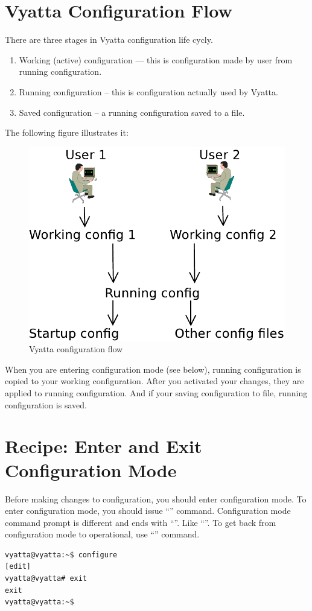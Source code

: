 \section{Vyatta Configuration Flow}
There are three stages in Vyatta configuration life cycly.
\begin{enumerate}
 \item Working (active) configuration --- this is configuration made by user from running configuration.
 \item Running configuration -- this is configuration actually used by Vyatta.
 \item Saved configuration -- a running configuration saved to a file.
\end{enumerate}
The following figure illustrates it:
\begin{figure}[hc]
 \begin{center}
   \includegraphics[width=\textwidth]{images/configuration_flow}
   \caption{Vyatta configuration flow}
  \end{center}
\end{figure}

When you are entering configuration mode (see below), running configuration is copied to your working
configuration. After you activated your changes, they are applied to running configuration. And if your
saving configuration to file, running configuration is saved.

\section{Recipe: Enter and Exit Configuration Mode}
\solution
Before making changes to configuration, you should enter configuration mode. To enter configuration mode, 
you should issue ``'' command. Configuration mode command prompt is
different and ends with ``\console{\#}''. Like ``''. To get back from configuration
mode to operational, use ``'' command.
\begin{verbatim}
vyatta@vyatta:~$ configure 
[edit]
vyatta@vyatta# exit
exit
vyatta@vyatta:~$ 
\end{verbatim}

